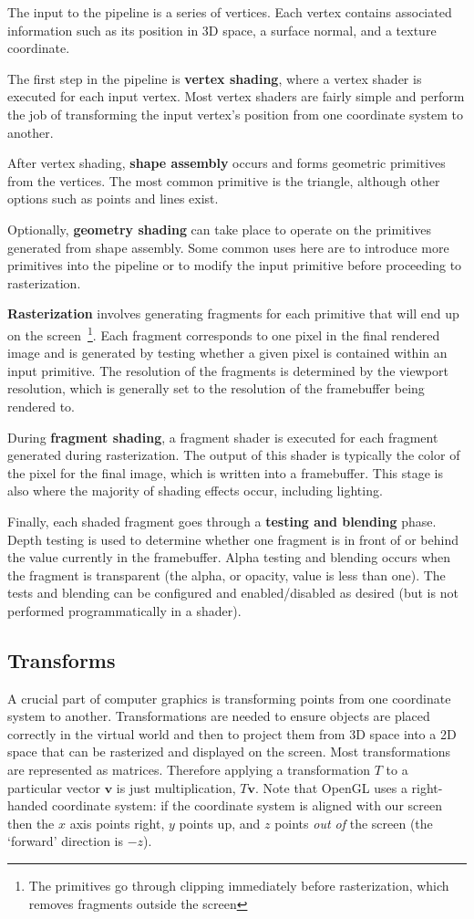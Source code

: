 The input to the pipeline is a series of vertices. Each vertex contains associated information such as its position in 3D space, a surface normal, and a texture coordinate.

The first step in the pipeline is \textbf{vertex shading}, where a vertex shader is executed for each input vertex. Most vertex shaders are fairly simple and perform the job of transforming the input vertex's position from one coordinate system to another.

After vertex shading, \textbf{shape assembly} occurs and forms geometric primitives from the vertices. The most common primitive is the triangle, although other options such as points and lines exist.

Optionally, \textbf{geometry shading} can take place to operate on the primitives generated from shape assembly. Some common uses here are to introduce more primitives into the pipeline or to modify the input primitive before proceeding to rasterization.

\textbf{Rasterization} involves generating fragments for each primitive that will end up on the screen~\footnote{The primitives go through clipping immediately before rasterization, which removes fragments outside the screen}. Each fragment corresponds to one pixel in the final rendered image and is generated by testing whether a given pixel is contained within an input primitive. The resolution of the fragments is determined by the viewport resolution, which is generally set to the resolution of the framebuffer being rendered to.

During \textbf{fragment shading}, a fragment shader is executed for each fragment generated during rasterization. The output of this shader is typically the color of the pixel for the final image, which is written into a framebuffer. This stage is also where the majority of shading effects occur, including lighting.

Finally, each shaded fragment goes through a \textbf{testing and blending} phase. Depth testing is used to determine whether one fragment is in front of or behind the value currently in the framebuffer. Alpha testing and blending occurs when the fragment is transparent (the alpha, or opacity, value is less than one). The tests and blending can be configured and enabled/disabled as desired (but is not performed programmatically in a shader).

\subsection{Transforms}
A crucial part of computer graphics is transforming points from one coordinate system to another. Transformations are needed to ensure objects are placed correctly in the virtual world and then to project them from 3D space into a 2D space that can be rasterized and displayed on the screen. Most transformations are represented as matrices. Therefore applying a transformation $T$ to a particular vector $\bm{v}$ is just multiplication, $T \bm{v}$. Note that OpenGL uses a right-handed coordinate system: if the coordinate system is aligned with our screen then the $x$ axis points right, $y$ points up, and $z$ points \textit{out of} the screen (the `forward' direction is $-z$).


